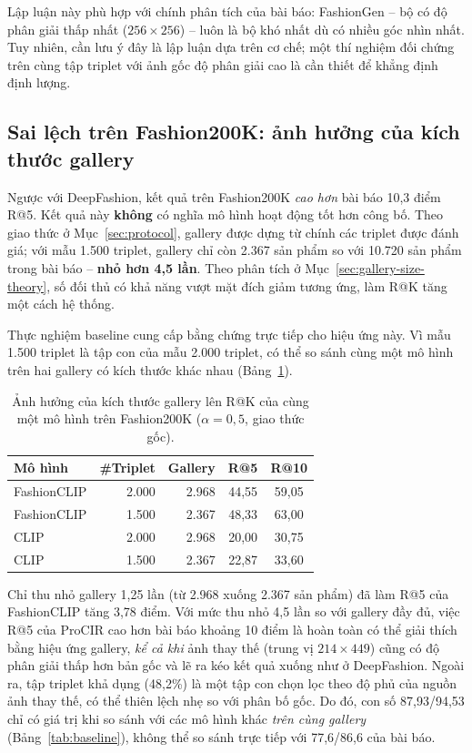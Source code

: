 Lập luận này phù hợp với chính phân tích của bài báo: FashionGen -- bộ có độ phân giải thấp nhất ($256 \times 256$) -- luôn là bộ khó nhất dù có nhiều góc nhìn nhất. Tuy nhiên, cần lưu ý đây là lập luận dựa trên cơ chế; một thí nghiệm đối chứng trên cùng tập triplet với ảnh gốc độ phân giải cao là cần thiết để khẳng định định lượng.

\subsection{Sai lệch trên Fashion200K: ảnh hưởng của kích thước gallery}

Ngược với DeepFashion, kết quả trên Fashion200K \emph{cao hơn} bài báo 10,3 điểm R@5. Kết quả này \textbf{không} có nghĩa mô hình hoạt động tốt hơn công bố. Theo giao thức ở Mục~\ref{sec:protocol}, gallery được dựng từ chính các triplet được đánh giá; với mẫu 1.500 triplet, gallery chỉ còn 2.367 sản phẩm so với 10.720 sản phẩm trong bài báo -- \textbf{nhỏ hơn 4,5 lần}. Theo phân tích ở Mục~\ref{sec:gallery-size-theory}, số đối thủ có khả năng vượt mặt đích giảm tương ứng, làm R@K tăng một cách hệ thống.

Thực nghiệm baseline cung cấp bằng chứng trực tiếp cho hiệu ứng này. Vì mẫu 1.500 triplet là tập con của mẫu 2.000 triplet, có thể so sánh cùng một mô hình trên hai gallery có kích thước khác nhau (Bảng~\ref{tab:gallery-effect}).

\begin{table}[h]
\centering
\caption{Ảnh hưởng của kích thước gallery lên R@K của cùng một mô hình trên Fashion200K ($\alpha = 0{,}5$, giao thức gốc).}
\label{tab:gallery-effect}
\begin{tabular}{lrrcc}
\toprule
Mô hình & \#Triplet & Gallery & R@5 & R@10 \\
\midrule
FashionCLIP & 2.000 & 2.968 & 44,55 & 59,05 \\
FashionCLIP & 1.500 & 2.367 & 48,33 & 63,00 \\
\midrule
CLIP        & 2.000 & 2.968 & 20,00 & 30,75 \\
CLIP        & 1.500 & 2.367 & 22,87 & 33,60 \\
\bottomrule
\end{tabular}
\end{table}

Chỉ thu nhỏ gallery 1,25 lần (từ 2.968 xuống 2.367 sản phẩm) đã làm R@5 của FashionCLIP tăng 3,78 điểm. Với mức thu nhỏ 4,5 lần so với gallery đầy đủ, việc R@5 của ProCIR cao hơn bài báo khoảng 10 điểm là hoàn toàn có thể giải thích bằng hiệu ứng gallery, \emph{kể cả khi} ảnh thay thế (trung vị $214 \times 449$) cũng có độ phân giải thấp hơn bản gốc và lẽ ra kéo kết quả xuống như ở DeepFashion. Ngoài ra, tập triplet khả dụng (48,2\%) là một tập con chọn lọc theo độ phủ của nguồn ảnh thay thế, có thể thiên lệch nhẹ so với phân bố gốc. Do đó, con số 87,93/94,53 chỉ có giá trị khi so sánh với các mô hình khác \emph{trên cùng gallery} (Bảng~\ref{tab:baseline}), không thể so sánh trực tiếp với 77,6/86,6 của bài báo.

